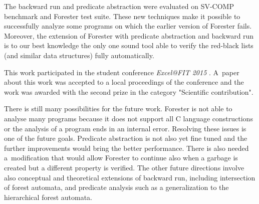 The backward run and predicate abstraction were evaluated on SV-COMP benchmark and
Forester test suite.
These new techniques make it possible to successfully analyze
some programs on which the earlier version of Forester fails.
Moreover, the extension of Forester with predicate abstraction and backward run
is to our best knowledge the only one sound tool
able to verify the red-black lists (and similar data structures)
fully automatically.

This work participated in the student conference \emph{Excel@FIT 2015} \cite{www:excel}.
A~paper about this work was accepted to a local proceedings of the conference
and the work was awarded with the second prize in the category "Scientific contribution".

There is still many possibilities for the future work.
Forester is not able to analyse many programs
because it does not support all C language constructions
or the analysis of a program ends in an internal error.
Resolving these issues is one of the future goals.
Predicate abstraction is not also yet fine tuned and
the further improvements would bring the better performance.
There is also needed a~modification that would allow Forester to continue also
when a garbage is created but a different property is verified.
The other future directions involve also conceptual and
theoretical extensions of backward run, including intersection of
forest automata, and predicate analysis such as a generalization
to the hierarchical forest automata.
